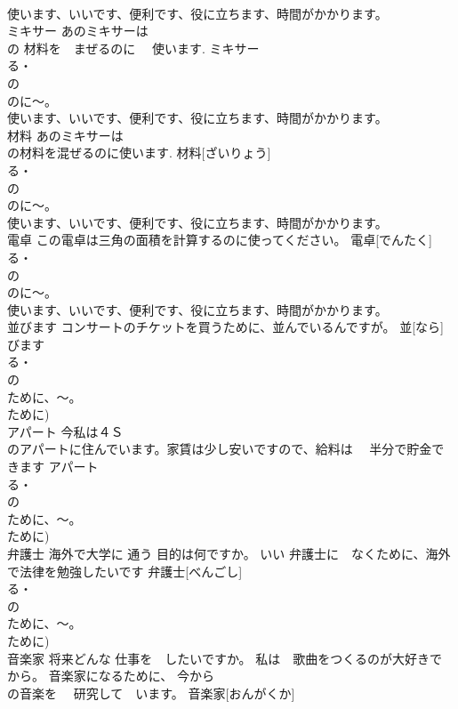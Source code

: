 \documentclass[8pt]{extreport}
\begin{document}
\begin{CJK}{UTF8}{min}
\\	使います、いいです、便利です、役に立ちます、時間がかかります。	
\\	ミキサー	あのミキサーは　 
\\	の 材料を　まぜるのに　 使います.	ミキサー			
\\	る・
\\	の　
\\	のに～。
\\	使います、いいです、便利です、役に立ちます、時間がかかります。		
\\	材料	あのミキサーは
\\	の材料を混ぜるのに使います.	材料[ざいりょう]			
\\	る・
\\	の　
\\	のに～。
\\	使います、いいです、便利です、役に立ちます、時間がかかります。	
\\	電卓	この電卓は三角の面積を計算するのに使ってください。	電卓[でんたく]			
\\	る・
\\	の　
\\	のに～。
\\	使います、いいです、便利です、役に立ちます、時間がかかります。	
\\	並びます	コンサートのチケットを買うために、並んでいるんですが。	並[なら]びます			
\\	る・
\\	の　
\\	ために、～。
\\	ために)
\\	アパート	今私は４Ｓ
\\	のアパートに住んでいます。家賃は少し安いですので、給料は　 半分で貯金できます	アパート				
\\	る・
\\	の　
\\	ために、～。
\\	ために)
\\	弁護士	海外で大学に 通う 目的は何ですか。 いい 弁護士に　なくために、海外で法律を勉強したいです	弁護士[べんごし]			
\\	る・
\\	の　
\\	ために、～。
\\	ために)
\\	音楽家	将来どんな 仕事を　したいですか。 私は　歌曲をつくるのが大好きで から。 音楽家になるために、 今から
\\	の音楽を　 研究して　います。	音楽家[おんがくか]			

\end{CJK}
\end{document}
